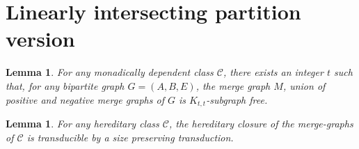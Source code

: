 \documentclass[11pt]{article}
\newtheorem{lemma}[theorem]{Lemma}
\theoremstyle{definition}
\newcommand{\CC}{{\mathscr C}}
\begin{document}
\section{Linearly intersecting partition version}
\begin{lemma}\label{cor:merge_deg2}
For any monadically dependent class $\CC$, there exists an integer $t$ such that, for any bipartite graph $G = (A, B, E)$, the merge graph $M$, union of positive and negative merge graphs of $G$ is $K_{t, t}$-subgraph free.
\end{lemma}

\begin{lemma}\label{lem:merge_graph_sp}
For any hereditary class $\mathcal C$, the hereditary closure of the merge-graphs of $\mathcal C$ is transducible by a size preserving transduction.
\end{lemma}

\
\end{document}

